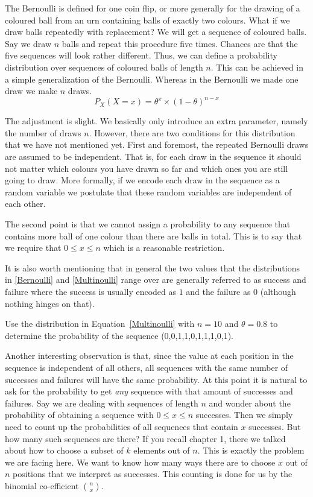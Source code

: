 \documentclass[a4paper,11pt,leqno]{report}
\begin{document}
The Bernoulli is defined for one coin flip, or more generally for the drawing of a coloured ball from an urn containing balls
of exactly two colours. What if we draw balls repeatedly with replacement? We will get a sequence of coloured balls. 
Say we draw $ n $ balls and repeat this procedure five times. Chances are that the five sequences will look rather different.
Thus, we can define a probability distribution over sequences of coloured balls of length $ n $. This can be achieved in a simple generalization
of the Bernoulli. Whereas in the Bernoulli we made one draw we make $ n $ draws.
\begin{equation}\label{Multinoulli}
P_{X}(X=x) = \theta^{x} \times (1 - \theta)^{n-x}
\end{equation}

The adjustment is slight. We basically only introduce an extra parameter, namely the number of draws $ n $. 
However, there are two conditions for this distribution that we have not mentioned yet. First and foremost,
the repeated Bernoulli draws are assumed to be independent. That is, for each draw in the sequence it should not matter which colours you
have drawn so far and which ones you are still going to draw. More formally, if we encode each draw in the sequence as a random
variable we postulate that these random variables are independent of each other. 

The second point is that we cannot assign a probability to any sequence that contains more ball of one colour than there are balls in total.
This is to say that we require that $ 0 \leq x \leq n $ which is a reasonable restriction. 

It is also worth mentioning that in general the two values that the distributions in \ref{Bernoulli} and \ref{Multinoulli} range
over are generally referred to as success and failure where the success is usually encoded as $ 1 $ and the failure as $ 0 $
(although nothing hinges on that). 

\begin{Exercise}
Use the distribution in Equation~\eqref{Multinoulli} with $ n = 10 $ and $ \theta = 0.8 $ to determine the probability of the sequence (0,0,1,1,0,1,1,1,0,1).
\end{Exercise}

Another interesting observation is that, since the value at each position in the sequence is independent of all others, all sequences with the same
number of successes and failures will have the same probability. At this point it is natural to ask for the probability to get \textit{any}
sequence with that amount of successes and failures. Say we are dealing with sequences of length $ n $ and wonder about the probability of 
obtaining a sequence with $ 0 \leq x \leq n $ successes. Then we simply need to count up the probabilities of all sequences that contain $ x $ 
successes. But how many such sequences are there? If you recall chapter 1, there we talked about how to choose a subset of $ k $ elements
out of $ n $. This is exactly the problem we are facing here. We want to know how many ways there are to choose $ x $ out of $ n $ positions
that we interpret as successes. This counting is done for us by the binomial co-efficient $ \binom{n}{x} $.
\end{document}
